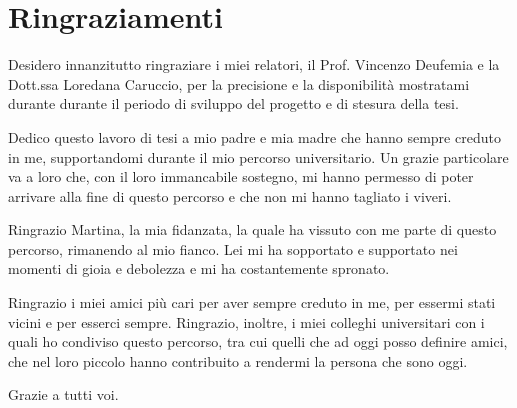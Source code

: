 \chapter{Ringraziamenti}
Desidero innanzitutto ringraziare i miei relatori, il Prof. Vincenzo Deufemia e la Dott.ssa Loredana Caruccio, per la precisione e la disponibilit\`{a} mostratami durante durante il periodo di sviluppo del progetto e di stesura della tesi.\par
\vspace{5mm}
Dedico questo lavoro di tesi a mio padre e mia madre che hanno sempre creduto in me, supportandomi durante il mio percorso universitario. Un grazie particolare va a loro che, con il loro immancabile sostegno, mi hanno permesso di poter arrivare alla fine di questo percorso e che non mi hanno tagliato i viveri.\par
\vspace{5mm}
Ringrazio Martina, la mia fidanzata, la quale ha vissuto con me parte di questo percorso, rimanendo al mio fianco. Lei mi ha sopportato e supportato nei momenti di gioia e debolezza e mi ha costantemente spronato.\par
\vspace{5mm}
Ringrazio i miei amici pi\`{u} cari per aver sempre creduto in me, per essermi stati vicini e per esserci sempre. Ringrazio, inoltre, i miei colleghi universitari con i quali ho condiviso questo percorso, tra cui quelli che ad oggi posso definire amici, che nel loro piccolo hanno contribuito a rendermi la persona che sono oggi.\par

\vfill
Grazie a tutti voi.